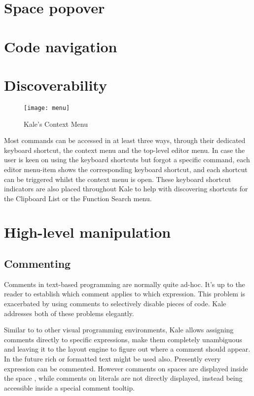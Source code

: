 \section{Space popover}




\section{Code navigation}


\needspace{8cm}
\section{Discoverability}
\begin{wrapfigure}[21]{r}{5.5cm}
\texttt{[image: menu]}
\caption{Kale's Context Menu}
\end{wrapfigure}
Most commands can be accessed in at least three ways, through their dedicated
keyboard shortcut, the context menu and the top-level editor menu. In case the
user is keen on using the keyboard shortcuts but forgot a specific command,
each editor menu-item shows the corresponding keyboard shortcut, and each
shortcut can be triggered whilst the context menu is open. These keyboard
shortcut indicators are also placed throughout Kale to help with discovering
shortcuts for the Clipboard List or the Function Search menu.




\section{High-level manipulation}

\subsection{Commenting}
Comments in text-based programming are normally quite ad-hoc. It's up to the
reader to establish which comment applies to which expression. This problem
is exacerbated by using comments to selectively disable pieces of code. Kale
addresses both of these problems elegantly.

Similar to to other visual
programming environments, Kale allows assigning comments directly to specific
expressions, make them completely unambiguous and leaving it to the layout
engine to figure out where a comment should appear. In the future rich or
formatted text might be used also. Presently every expression can be commented.
However comments on spaces are displayed inside the space , while
comments on literals are not directly displayed, instead being accessible
inside a special comment tooltip.

